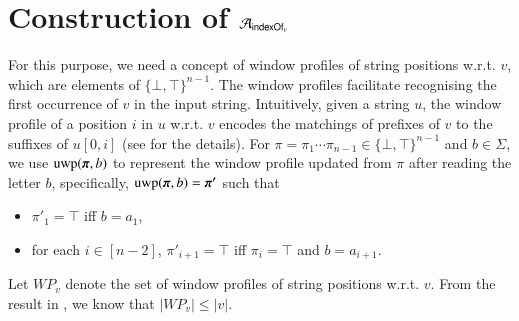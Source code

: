 %
\section{Construction of $\mathcal{A}_{\mathsf{indexOf}_v}$} \label{appendix:cefa_indexof}
For this purpose, we need a concept of window profiles of  string positions w.r.t. $v$, which are elements of $\{\bot, \top\}^{n-1}$. The window profiles facilitate recognising the first occurrence of $v$ in the input string. 
Intuitively, given a string $u$, the window profile of a position $i$ in $u$ w.r.t. $v$ encodes the matchings of prefixes of $v$ to the suffixes of $u[0,i]$ (see \cite{CCH+18} for the details). For $\pi = \pi_1 \cdots \pi_{n-1} \in \{\bot, \top\}^{n-1}$ and $b \in \Sigma$, we use $\uwp(\vec{\pi}, b)$ to represent the window profile updated from $\pi$ after reading the letter $b$, specifically, $\uwp(\vec{\pi}, b) = \vec{\pi'}$ such that  
\begin{itemize}
\item $\pi'_1 = \top$ iff $b = a_1$, 
%
\item for each $i \in [n-2]$, $\pi'_{i+1} = \top$ iff $\pi_{i} = \top$ and $b = a_{i+1}$. 
\end{itemize}
Let $WP_v$ denote the set of window profiles of string positions w.r.t. $v$. From the result in \cite{CCH+18}, we know that $|WP_v| \le |v|$. 
%
%
